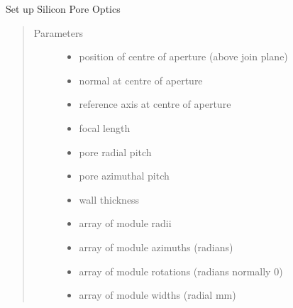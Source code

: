 \documentclass[letterpaper,10pt,english]{sphinxmanual}
\begin{document}
\begin{fulllineitems}
\label{\detokenize{xsrt_functions:xsrt.sipore}}
Set up Silicon Pore Optics
\begin{quote}\begin{description}
\item[{Parameters}] \leavevmode\begin{itemize}
\item {} 
 \textendash{} position of centre of aperture (above join plane)

\item {} 
 \textendash{} normal at centre of aperture

\item {} 
 \textendash{} reference axis at centre of aperture

\item {} 
 \textendash{} focal length

\item {} 
 \textendash{} pore radial pitch

\item {} 
 \textendash{} pore azimuthal pitch

\item {} 
 \textendash{} wall thickness

\item {} 
 \textendash{} array of module radii

\item {} 
 \textendash{} array of module azimuths (radians)

\item {} 
 \textendash{} array of module rotations (radians normally 0)

\item {} 
 \textendash{} array of module widths (radial mm)


\end{itemize}
\end{description}
\end{quote}
\end{fulllineitems}
\end{document}
